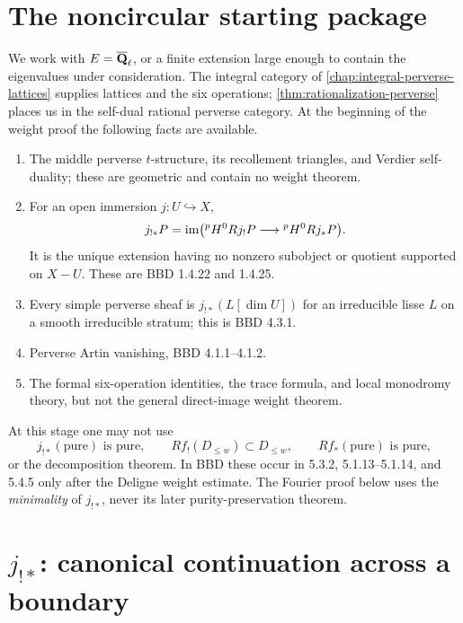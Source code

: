 \section{The noncircular starting package}

We work with \(E=\overline{\mathbf Q}_\ell\), or a finite extension large enough to contain the
eigenvalues under consideration.  The integral category of
\cref{chap:integral-perverse-lattices} supplies lattices and the six
operations; \cref{thm:rationalization-perverse} places us in the self-dual
rational perverse category.  At the beginning of the weight proof the
following facts are available.

\begin{enumerate}
\item The middle perverse \(t\)-structure, its recollement triangles, and
      Verdier self-duality; these are geometric and contain no weight
      theorem.
\item For an open immersion \(j:U\hookrightarrow X\),
      \[
        j_{!*}P=\operatorname{im}\bigl({}^pH^0Rj_!P\longrightarrow{}^pH^0Rj_*P\bigr).
      \]
      It is the unique extension having no nonzero subobject or quotient
      supported on \(X-U\).  These are BBD 1.4.22 and 1.4.25.
\item Every simple perverse sheaf is
      \(j_{!*}(L[\dim U])\) for an irreducible lisse \(L\) on a smooth
      irreducible stratum; this is BBD 4.3.1.
\item Perverse Artin vanishing, BBD 4.1.1--4.1.2.
\item The formal six-operation identities, the trace formula, and local
      monodromy theory, but not the general direct-image weight theorem.
\end{enumerate}

\begin{auditbox}[title={What is not yet available}]
At this stage one may not use
\[
  j_{!*}(\text{pure})\text{ is pure},\qquad
  Rf_!(D_{\leq w})\subset D_{\leq w},\qquad
  Rf_*(\text{pure})\text{ is pure},
\]
or the decomposition theorem.  In BBD these occur in
5.3.2, 5.1.13--5.1.14, and 5.4.5 only after the Deligne weight estimate.
The Fourier proof below uses the \emph{minimality} of \(j_{!*}\), never its
later purity-preservation theorem.
\end{auditbox}

\section{\texorpdfstring{\(j_{!*}\)}{Middle extension}: canonical continuation across a boundary}

